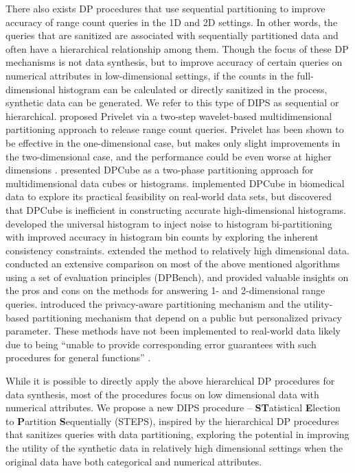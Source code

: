 \documentclass[12pt, A4]{article}
\theoremstyle{plain}
\theoremstyle{exampstyle}\newtheorem{defn}{Definition}
\theoremstyle{exampstyle}\newtheorem{lem}{Lemma}
\theoremstyle{exampstyle}\newtheorem{cor}{Corollary}
\theoremstyle{exampstyle}\newtheorem{pro}{Proposition}
\theoremstyle{exampstyle}\newtheorem{cla}{Claim}
\theoremstyle{exampstyle}\newtheorem{rem}{Remark}
\begin{document}
There also exists DP procedures that use sequential partitioning to improve accuracy of range count queries in the 1D and 2D settings. In other words, the queries that are sanitized are associated with sequentially partitioned data and often have a hierarchical relationship among them. Though the focus of these DP mechanisms is not data synthesis, but to improve accuracy of certain queries on numerical attributes in low-dimensional settings, if the counts in the full-dimensional histogram can be calculated or directly sanitized in the process, synthetic data can be generated. We refer to this type of DIPS as sequential or hierarchical. \citet{xiao2010differentially} proposed Privelet via a two-step wavelet-based multidimensional partitioning approach to release range count queries. Privelet has been shown to be effective in the one-dimensional case, but makes only slight improvements in the two-dimensional case, and the performance could be even worse at higher dimensions \citep{qardaji2013geo}. \citet{xiao2012dpcube} presented DPCube as a two-phase partitioning approach for multidimensional data cubes or histograms. \citet{gardner2013share} implemented DPCube in biomedical data to explore its practical feasibility on real-world data sets, but discovered that DPCube is inefficient in constructing accurate high-dimensional histograms. \citet{hay2010boosting} developed the universal histogram to inject noise to histogram bi-partitioning with improved accuracy in histogram bin counts by exploring the inherent consistency constraints. \cite{qardaji2013understanding} extended the method to relatively high dimensional data. \citet{hay2016principled} conducted an extensive comparison on most of the above mentioned algorithms using a set of evaluation principles (DPBench), and provided valuable insights on the pros and cons on the  methods for answering 1- and 2-dimensional range queries. \citet{li2017partitioning} introduced the privacy-aware partitioning mechanism and the utility-based partitioning mechanism that depend on a public but personalized privacy parameter. These methods have not been implemented to real-world data likely due to being ``unable to provide corresponding error guarantees with such procedures for general functions'' \citep{cummings2018individual}. 

While it is possible to directly apply the above hierarchical DP procedures for data synthesis, most of the procedures focus on low dimensional data with numerical attributes. We propose a new DIPS procedure -- \textbf{ST}atistical \textbf{E}lection to \textbf{P}artition \textbf{S}equentially (STEPS), inspired by the hierarchical  DP procedures that sanitizes queries with data partitioning, exploring the potential in improving the utility of the synthetic data in relatively high dimensional settings when the original data have both categorical and numerical attributes. 
\end{document}
